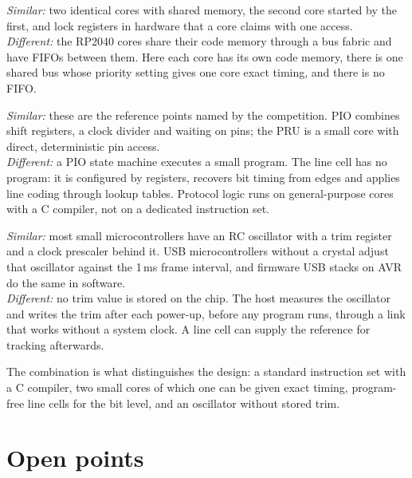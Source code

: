 \documentclass[10pt,a4paper]{article}
\begin{document}
\begin{description}[leftmargin=1.4em,style=nextline,itemsep=4pt]
\item[RP2040 dual core]
\textit{Similar:} two identical cores with shared memory, the second core started by the first, and lock
registers in hardware that a core claims with one access.\\
\textit{Different:} the RP2040 cores share their code memory through a bus fabric and have FIFOs between
them. Here each core has its own code memory, there is one shared bus whose priority setting gives one core
exact timing, and there is no FIFO.

\item[RP2040 PIO and TI PRU]
\textit{Similar:} these are the reference points named by the competition. PIO combines shift registers, a
clock divider and waiting on pins; the PRU is a small core with direct, deterministic pin access.\\
\textit{Different:} a PIO state machine executes a small program. The line cell has no program: it is
configured by registers, recovers bit timing from edges and applies line coding through lookup tables.
Protocol logic runs on general-purpose cores with a C compiler, not on a dedicated instruction set.

\item[Oscillator trimming against a reference]
\textit{Similar:} most small microcontrollers have an RC oscillator with a trim register and a clock prescaler
behind it. USB microcontrollers without a crystal adjust that oscillator against the 1\,ms frame interval, and
firmware USB stacks on AVR do the same in software.\\
\textit{Different:} no trim value is stored on the chip. The host measures the oscillator and writes the trim
after each power-up, before any program runs, through a link that works without a system clock. A line cell
can supply the reference for tracking afterwards.
\end{description}

The combination is what distinguishes the design: a standard instruction set with a C compiler, two small cores of which one can be given exact timing, program-free line cells for the bit level, and an oscillator without stored trim.

\section{Open points}
\end{document}
